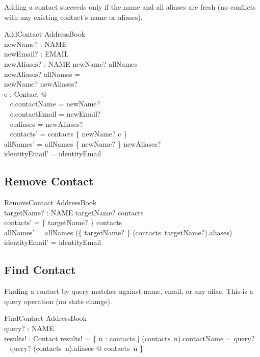 \documentclass[a4paper,10pt,fleqn]{article}
\begin{document}
Adding a contact succeeds only if the name and all aliases are fresh
(no conflicts with any existing contact's name or aliases).

\begin{schema}{AddContact}
\Delta AddressBook \\
newName? : NAME \\
newEmail? : EMAIL \\
newAliases? : \power NAME
\where
newName? \notin allNames \\
newAliases? \cap allNames = \emptyset \\
newName? \notin newAliases? \\
\exists c : Contact @ \\
\quad~ c.contactName = newName? \land \\
\quad~ c.contactEmail = newEmail? \land \\
\quad~ c.aliases = newAliases? \land \\
\quad~ contacts' = contacts \cup \{ newName? \mapsto c \} \\
allNames' = allNames \cup \{ newName? \} \cup newAliases? \\
identityEmail' = identityEmail
\end{schema}

\subsection{Remove Contact}

\begin{schema}{RemoveContact}
\Delta AddressBook \\
targetName? : NAME
\where
targetName? \in \dom contacts \\
contacts' = \{ targetName? \} \ndres contacts \\
allNames' = allNames \setminus
  (\{ targetName? \} \cup (contacts~targetName?).aliases) \\
identityEmail' = identityEmail
\end{schema}

\subsection{Find Contact}

Finding a contact by query matches against name, email, or any alias.
This is a query operation (no state change).

\begin{schema}{FindContact}
\Xi AddressBook \\
query? : NAME \\
results! : \power Contact
\where
results! = \{ n : \dom contacts |
  (contacts~n).contactName = query? \lor \\
\quad~ query? \in (contacts~n).aliases @ contacts~n \}
\end{schema}
\end{document}
